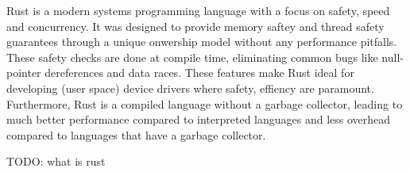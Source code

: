 Rust is a modern systems programming language with a focus on safety, speed and concurrency. It was designed to provide memory saftey and thread safety guarantees through a unique onwership model without any performance pitfalls. These safety checks are done at compile time, eliminating common bugs like null-pointer dereferences and data races. These features make Rust ideal for developing (user space) device drivers where safety, effiency are paramount. Furthermore, Rust is a compiled language without a garbage collector, leading to much better performance compared to interpreted languages and less overhead compared to languages that have a garbage collector.


TODO: what is rust
